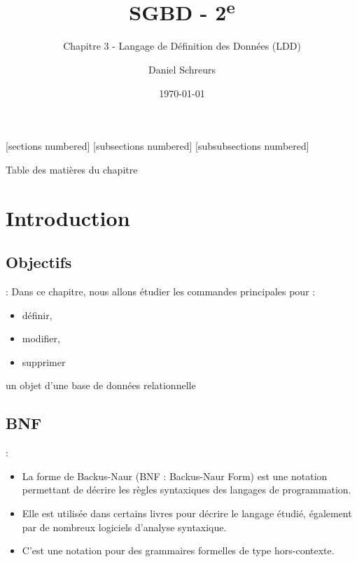 \documentclass[10pt]{beamer}
\title{SGBD - 2\textsuperscript{e}}
\subtitle{Chapitre 3 - Langage de Définition des Données (LDD)}
\date{\today}
\author{Daniel Schreurs}
\institute{Haute École de la Province de Liège}
\begin{document}
\maketitle

[sections numbered]
[subsections numbered]
[subsubsections numbered]
\begin{frame}[allowframebreaks]{Table des matières du chapitre}
    \tableofcontents[subsectionstyle=show/show/hide,subsubsectionstyle=show/show/hide,]
\end{frame}

\section{Introduction}
\tocss
\subsection{Objectifs}
\begin{frame}{\secname : \subsecname}
    Dans ce chapitre, nous allons étudier les commandes principales pour :

    \begin{itemize}
        \item définir,
        \item modifier,
        \item supprimer
    \end{itemize}
    un objet d’une base de données relationnelle
\end{frame}

\subsection{BNF}
\begin{frame}{\secname : \subsecname}
    \begin{itemize}
        \item La forme de Backus-Naur (BNF : Backus-Naur Form) est une notation permettant de décrire les règles syntaxiques des langages de programmation.
        \item Elle est utilisée dans certains livres pour décrire le langage étudié, également par de nombreux logiciels d'analyse syntaxique.
        \item C'est une notation pour des grammaires formelles de type hors-contexte.
    \end{itemize}
\end{frame}
\end{document}
